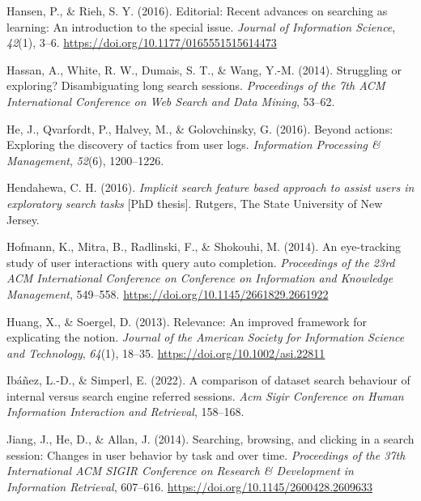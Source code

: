 \documentclass[letterpaper, nobind]{templates/ociamthesis}
\newlength{\cslhangindent}
\newenvironment{CSLReferences}[2] %
 {%
  \setlength{\parindent}{0pt}
  \ifodd #1
  \let\oldpar\par
  \def\par{\hangindent=\cslhangindent\oldpar}
  \fi
  \setlength{\parskip}{1mm}
  \setlength{\baselineskip}{6mm}
 }%
 {}
\begin{document}
\begin{CSLReferences}{1}{0}
\leavevmode{}%
Hansen, P., \& Rieh, S. Y. (2016). Editorial: Recent advances on searching as learning: An introduction to the special issue. \emph{Journal of Information Science}, \emph{42}(1), 3--6. \url{https://doi.org/10.1177/0165551515614473}

\leavevmode{}%
Hassan, A., White, R. W., Dumais, S. T., \& Wang, Y.-M. (2014). Struggling or exploring? Disambiguating long search sessions. \emph{Proceedings of the 7th ACM International Conference on Web Search and Data Mining}, 53--62.

\leavevmode{}%
He, J., Qvarfordt, P., Halvey, M., \& Golovchinsky, G. (2016). Beyond actions: Exploring the discovery of tactics from user logs. \emph{Information Processing \& Management}, \emph{52}(6), 1200--1226.

\leavevmode{}%
Hendahewa, C. H. (2016). \emph{Implicit search feature based approach to assist users in exploratory search tasks} {[}PhD thesis{]}. Rutgers, The State University of New Jersey.

\leavevmode{}%
Hofmann, K., Mitra, B., Radlinski, F., \& Shokouhi, M. (2014). An eye-tracking study of user interactions with query auto completion. \emph{Proceedings of the 23rd {ACM} International Conference on Conference on Information and Knowledge Management}, 549--558. \url{https://doi.org/10.1145/2661829.2661922}

\leavevmode{}%
Huang, X., \& Soergel, D. (2013). Relevance: {An} improved framework for explicating the notion. \emph{Journal of the American Society for Information Science and Technology}, \emph{64}(1), 18--35. \url{https://doi.org/10.1002/asi.22811}

\leavevmode{}%
Ibáñez, L.-D., \& Simperl, E. (2022). A comparison of dataset search behaviour of internal versus search engine referred sessions. \emph{Acm Sigir Conference on Human Information Interaction and Retrieval}, 158--168.

\leavevmode{}%
Jiang, J., He, D., \& Allan, J. (2014). Searching, browsing, and clicking in a search session: {Changes} in user behavior by task and over time. \emph{Proceedings of the 37th International {ACM SIGIR} Conference on Research \& Development in Information Retrieval}, 607--616. \url{https://doi.org/10.1145/2600428.2609633}


\end{CSLReferences}
\end{document}
